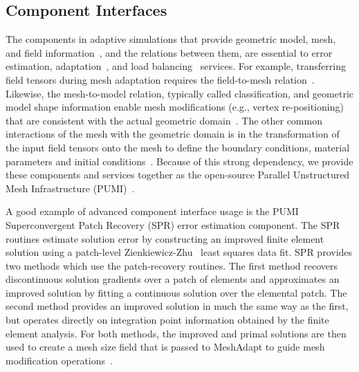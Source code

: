 \subsection{Component Interfaces}\label{sec:imp_Interfaces}
The components in adaptive simulations that provide geometric model, mesh, and
field information~\cite{BeaWal,ibanez2016pumi,Ollivier10}, and the relations
between them, are essential to error estimation,
adaptation~\cite{park2008parallel,loseille2015parallel,kirk2006libmesh}, and
load balancing~\cite{SmithParma2015} services.
For example, transferring field tensors during mesh adaptation requires the
field-to-mesh relation~\cite{farrell2009conservative}.
Likewise, the mesh-to-model relation, typically called classification, and
geometric model shape information enable mesh modifications (e.g., vertex
re-positioning) that are consistent with the actual geometric
domain~\cite{BeaWal}.
The other common interactions of the mesh with the geometric domain
is in the transformation of the input field tensors onto the
mesh to define the boundary conditions, material parameters and initial
conditions~\cite{OBaBea}.
Because of this strong dependency, we provide these components and services
together as the open-source Parallel Unstructured Mesh Infrastructure
(PUMI)~\cite{ibanez2016pumi,pumi_github}.

A good example of advanced component interface usage is the PUMI
Superconvergent Patch Recovery (SPR) error estimation component.
The SPR routines estimate solution error by constructing an improved
finite element solution using a patch-level Zienkiewicz-Zhu~\cite{zz2} least
squares data fit.
SPR provides two methods which use the patch-recovery routines.
The first method recovers discontinuous solution gradients over a patch of
elements and approximates an improved solution by fitting a continuous solution
over the elemental patch.
The second method provides an improved solution in much the same way as the
first, but operates directly on integration point information obtained by the
finite element analysis.
For both methods, the improved and primal solutions are then used to create a
mesh size field that is passed to MeshAdapt to
guide mesh modification operations~\cite{alauzet2006parallel,frey2005}.
